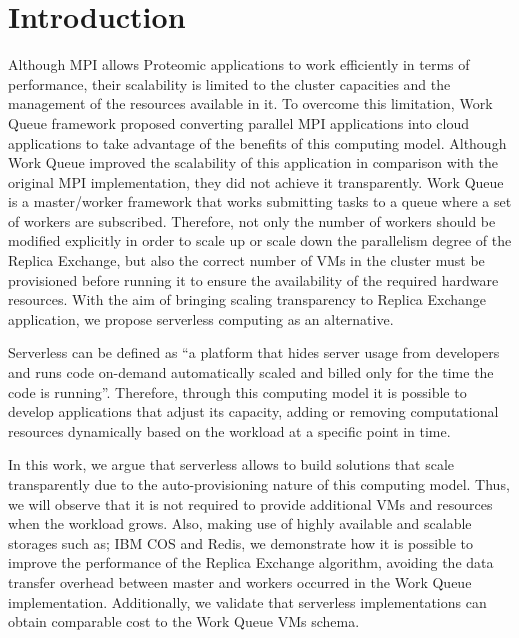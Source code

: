 \documentclass[sigplan, screen]{acmart}
\begin{document}

\maketitle
\fancyhead{}

\fancyfoot[R]{\thepage}
\setlength{\footskip}{40pt}

\section{Introduction}

Although MPI allows Proteomic applications to work efficiently in terms of performance, their scalability is limited to the cluster capacities and the management of the resources available in it. To overcome this limitation, Work Queue framework\cite{wqPython} proposed converting parallel MPI applications into cloud applications to take advantage of the  benefits of this computing model.  Although Work Queue improved the scalability of this application in comparison with the original MPI implementation, they did not achieve it transparently. Work Queue is a master/worker framework that works submitting tasks to a queue where a set of workers are subscribed. Therefore, not only the number of workers should be modified explicitly in order to scale up or scale down the parallelism degree of the Replica Exchange, but also the correct number of VMs in the cluster must be provisioned before running it to ensure the availability of the required hardware resources. With the aim of bringing scaling transparency to Replica Exchange application, we propose serverless computing as an alternative.

Serverless can be defined as “a platform that hides server usage from developers and runs code on-demand automatically scaled and billed only for the time the code is running”\cite{rsOfServerless}.
Therefore, through this computing model it is possible to develop applications that adjust its capacity, adding or removing computational resources dynamically based on the workload at a specific point in time.

In this work, we argue that serverless allows to build solutions that scale transparently due to the auto-provisioning nature of this computing model. Thus, we will observe that it is not required to provide additional VMs and resources when the workload grows. Also, making use of highly available and scalable storages such as; IBM COS\cite{ibm-cos} and Redis\cite{redis}, we demonstrate how it is possible to improve the performance of the Replica Exchange algorithm, avoiding the data transfer overhead between master and workers occurred in the  Work Queue implementation. Additionally, we validate that serverless implementations can obtain comparable cost to the Work Queue VMs schema.
\end{document}
